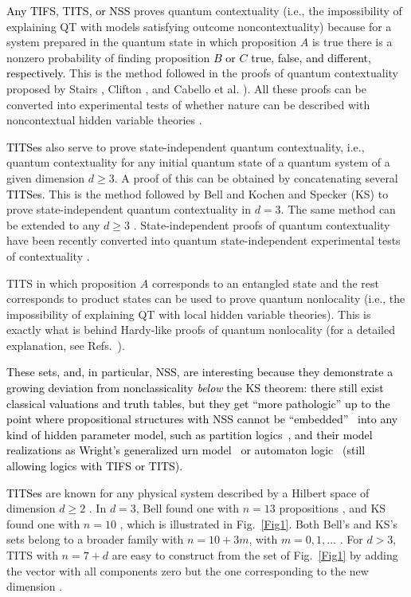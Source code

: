 \documentclass[%
  twocolumn,
 showpacs,
 showkeys,
 preprintnumbers,
 amsmath,amssymb,
 aps,
  pra,
  longbibliography,
 floatfix,
 ]{revtex4-1}
\newcommand{\karl}[1]{\textcolor{black}{#1}}
\begin{document}
\karl{Any  TIFS, TITS, or NSS}
proves quantum contextuality (i.e., the impossibility of explaining QT with models satisfying outcome noncontextuality)
because for a system prepared in the quantum state in which proposition $A$ is true
there is a nonzero probability of finding proposition \karl{$B$ or $C$ true, false, and different, respectively.}
This is the method followed in the proofs of quantum contextuality proposed by Stairs \cite{code5}, Clifton \cite{code6}, and Cabello et al. \cite{code7,code7b}). All these proofs can be converted into experimental tests of whether nature can be described with noncontextual hidden variable theories \cite{code8}.

\karl{TITSes} also serve to prove state-independent quantum contextuality, i.e., quantum contextuality for any initial quantum state of a quantum system of a given dimension $d \ge 3$. A proof of this can be obtained by concatenating several \karl{TITSes}. This is the method followed by Bell \cite{code3} and Kochen and Specker (KS) \cite{code4} to prove state-independent quantum contextuality in $d=3$. The same method can be extended to any $d \ge 3$ \cite{code9}. State-independent proofs of quantum contextuality have been recently converted into quantum state-independent experimental tests of contextuality \cite{code10, code11, code12, code13, code14, code14b, code14c}.

TITS in which proposition $A$ corresponds to an entangled state and the rest corresponds to product states can be used to prove quantum nonlocality (i.e., the impossibility of explaining QT with local hidden variable theories). This is exactly what is behind Hardy-like proofs of quantum nonlocality \cite{code14d, code14e} (for a detailed explanation, see Refs.~\cite{code14f, code14g}).


\karl{These sets, and, in particular, NSS, are interesting because they demonstrate
a growing deviation from nonclassicality {\em below} the KS theorem:
there still exist classical valuations and truth tables, but they get ``more pathologic''
up to the point where propositional structures with NSS cannot
be ``embedded''~\cite{KS67} into any kind of hidden parameter model, such as partition logics~\cite{svozil-2001-eua},
and their model realizations as Wright's generalized urn model~\cite{wright} or automaton logic~\cite{schaller-96}
(still allowing logics with TIFS or TITS).}

\karl{TITSes} are known for any physical system described by a Hilbert space of dimension $d \ge 2$ \cite{code2, code3, code4}. In $d=3$, Bell found one with $n= 13$ propositions \cite{code3}, and KS found one with $n=10$ \cite{code2, code3, code4}, which is illustrated in Fig.~\ref{Fig1}. Both Bell's and KS's sets belong to a broader family with $n=10+3m$, with $m=0,1,\ldots$ \cite{code7}. For $d>3$, TITS with $n=7+d$ are easy to construct from the set of Fig.~\ref{Fig1} by adding the vector with all components zero but the one corresponding to the new dimension \cite{code9}.
\end{document}
